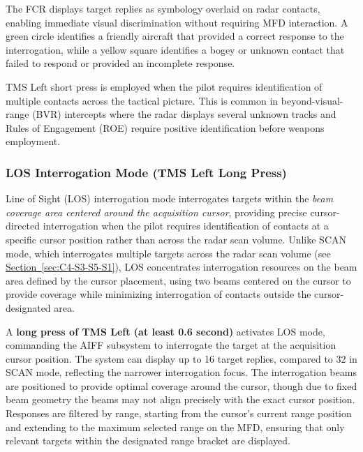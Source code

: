 \documentclass[11pt, a4paper, twoside]{report}
\newcommand{\secref}[1]{\hyperref[#1]{Section~\ref*{#1}}}
\begin{document}
The FCR displays target replies as symbology overlaid on radar contacts, enabling immediate visual discrimination without requiring MFD interaction. A green circle identifies a friendly aircraft that provided a correct response to the interrogation, while a yellow square identifies a bogey or unknown contact that failed to respond or provided an incomplete response.

TMS Left short press is employed when the pilot requires identification of multiple contacts across the tactical picture. This is common in beyond-visual-range (BVR) intercepts where the radar displays several unknown tracks and Rules of Engagement (ROE) require positive identification before weapons employment.

\subsubsection{LOS Interrogation Mode (TMS Left Long Press)}
\label{sec:C4-S3-S5-S2}

Line of Sight (LOS) interrogation mode interrogates targets within the \textit{beam coverage area centered around the acquisition cursor}, providing precise cursor-directed interrogation when the pilot requires identification of contacts at a specific cursor position rather than across the radar scan volume. Unlike SCAN mode, which interrogates multiple targets across the radar scan volume (see \secref{sec:C4-S3-S5-S1}), LOS concentrates interrogation resources on the beam area defined by the cursor placement, using two beams centered on the cursor to provide coverage while minimizing interrogation of contacts outside the cursor-designated area.

A \textbf{long press of TMS Left (at least 0.6 second)} activates LOS mode, commanding the AIFF subsystem to interrogate the target at the acquisition cursor position. The system can display up to 16 target replies, compared to 32 in SCAN mode, reflecting the narrower interrogation focus. The interrogation beams are positioned to provide optimal coverage around the cursor, though due to fixed beam geometry the beams may not align precisely with the exact cursor position. Responses are filtered by range, starting from the cursor's current range position and extending to the maximum selected range on the MFD, ensuring that only relevant targets within the designated range bracket are displayed.
\end{document}
